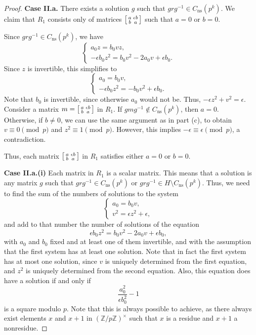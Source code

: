 \documentclass[10pt,a4paper]{amsart}
\newcommand{\Z}{\mathbb{Z}}
\newcommand\sm[1]{\begin{bsmallmatrix}#1\end{bsmallmatrix}}
\begin{document}
\begin{proof}
\noindent \textbf{Case II.a.} There exists a solution $g$ such that $grg^{-1}\in C_{\mathrm{ns}}(p^k)$. We claim that $R_1$ consists only of matrices $\sm{a & \epsilon b \\ b & a}$ such that $a=0$ or $b=0$.


 Since $grg^{-1} \in C_{\mathrm{ns}}(p^k)$, we have $$\begin{cases}
    a_0z=b_0vz, \\
    -\epsilon b_0z^2=b_0v^2-2a_0v+\epsilon b_0.
\end{cases}    
$$
Since $z$ is invertible, this simplifies to $$\begin{cases}
    a_0=b_0v, \\
    -\epsilon b_0z^2=-b_0v^2+\epsilon b_0.
\end{cases}$$
Note that $b_0$ is invertible, since otherwise $a_0$ would not be. Thus, $-\epsilon z^2+v^2=\epsilon.$
Consider a matrix $m=\sm{a & \epsilon b \\ b & a}$ in $R_1$. If $gmg^{-1}\not \in C_{\mathrm{ns}}(p^k)$, then $a=0$. Otherwise, if $b\neq 0$, we can use the same argument as in part (c), to obtain $v\equiv 0 \pmod p$ and $z^2\equiv 1 \pmod p$. However, this implies $-\epsilon \equiv \epsilon \pmod p$, a contradiction.   

Thus, each matrix $\sm{a &  \epsilon b \\ b & a}$ in $R_1$ satisfies either $a=0$ or $b=0$.

\noindent \textbf{Case II.a.(i)} Each matrix in $R_1$ is a scalar matrix. This means that a solution is any matrix $g$ such that $grg^{-1} \in C_{\mathrm{ns}}(p^k)$ or $grg^{-1} \in H\setminus C_{\mathrm{ns}}(p^k)$. Thus, we need to find the sum of the numbers of solutions to the system $$\begin{cases}
a_0=b_0v, \\
v^2=\epsilon z^2+\epsilon,
\end{cases}$$
and add to that number the number of solutions of the equation\begin{equation} \label{bla2}
    \epsilon b_0 z^2=b_0 v^2-2a_0v+\epsilon b_0,
\end{equation}
with $a_0$ and $b_0$ fixed and at least one of them invertible, and with the assumption that the first system has at least one solution. Note that in fact the first system has at most one solution, since $v$ is uniquely determined from the first equation, and $z^2$ is uniquely determined from the second equation. Also, this equation does have a solution if and only if $$\frac{a_0^2}{\epsilon b_0^2}-1$$ is a square modulo $p$. Note that this is always possible to achieve, as there always exist elements $x$ and $x+1$ in $(\Z/p\Z)^\times$ such that $x$ is a residue and $x+1$ a nonresidue.


\end{proof}
\end{document}
